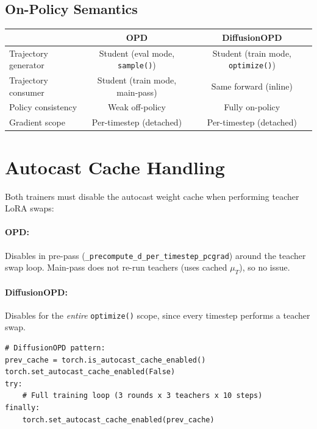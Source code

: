 \documentclass[11pt]{article}
\begin{document}
\subsection{On-Policy Semantics}

\begin{table}[h]
\centering
\begin{tabular}{lcc}
\toprule
 & OPD & DiffusionOPD \\
\midrule
Trajectory generator & Student (eval mode, \texttt{sample()}) & Student (train mode, \texttt{optimize()}) \\
Trajectory consumer & Student (train mode, main-pass) & Same forward (inline) \\
Policy consistency & Weak off-policy\footnotemark & Fully on-policy \\
Gradient scope & Per-timestep (detached) & Per-timestep (detached) \\
\bottomrule
\end{tabular}
\end{table}

\section{Autocast Cache Handling}

Both trainers must disable the autocast weight cache when performing teacher LoRA swaps:

\paragraph{OPD:} Disables in pre-pass (\texttt{\_precompute\_d\_per\_timestep\_pcgrad}) around the teacher swap loop. Main-pass does not re-run teachers (uses cached $\mu_T$), so no issue.

\paragraph{DiffusionOPD:} Disables for the \emph{entire} \texttt{optimize()} scope, since every timestep performs a teacher swap.

\begin{lstlisting}
# DiffusionOPD pattern:
prev_cache = torch.is_autocast_cache_enabled()
torch.set_autocast_cache_enabled(False)
try:
    # Full training loop (3 rounds x 3 teachers x 10 steps)
finally:
    torch.set_autocast_cache_enabled(prev_cache)
\end{lstlisting}
\end{document}
